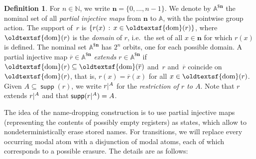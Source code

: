 \documentclass[10pt,a4paper]{amsart}
\theoremstyle{definition}
\newtheorem{defn}[theo]{Definition}
\renewcommand{\textsf}[1]{{\oldtextsf{\small#1}}}
\newcommand\restr[2]{{%
  \left.\kern-\nulldelimiterspace %
  #1 %
  \littletaller %
  \right|{}^{#2} %
}}
\newcommand{\littletaller}{\mathchoice{\vphantom{\big|}}{}{}{}}
\newcommand{\seq}{\subseteq}
\newcommand{\At}{\mathds{A}}
\DeclareMathOperator{\dom}{\textsf{dom}}
\DeclareMathOperator{\supp}{\mathsf{supp}}
\newcommand{\names}{\At}
\newcommand{\parnom}[1]{\names^{\$\mathbf{#1}}}
\newcommand{\setw}[2]{\{#1\,:\,#2\}}
\newcommand{\Nat}{\mathds{N}}
\let\originalleft\left
\let\originalright\right
\renewcommand{\left}{\mathopen{}\mathclose\bgroup\originalleft}
\renewcommand{\right}{\aftergroup\egroup\originalright}
\begin{document}
\begin{defn}\label{defn:dollar}
  For $n\in\Nat$, we write $\mathbf{n}=\{0,\dots,n-1\}$. We denote by
  $\parnom{n}$ the nominal set of all \emph{partial injective maps}
  from $\mathbf{n}$ to $\names$, with the pointwise group action.  The
  support of~$r$ is $\setw{r(x)}{x \in \dom(r)}$, where $\dom(r)$ is
  the \emph{domain} of $r$, i.e.~the set of all $x \in \mathbf{n}$ for
  which $r(x)$ is defined. The nominal set
  $\parnom{n}$ has $2^{n}$ orbits, one for each possible
  domain. A partial injective map
  $\overline{r} \in \parnom{n}$ \emph{extends} $r \in \parnom{n}$ if
  $\dom(r) \seq \dom(\overline{r})$ and~$r$ and~$\overline{r}$
  coincide on $\dom(r)$, that is, $r(x) = \overline{r}(x)$ for all
  $x \in \dom(r)$.  Given $A \seq \supp(r)$, we write $\restr{r}{A}$
  for the \emph{restriction of $r$ to $A$}. Note that $r$ extends
  $\restr{r}{A}$ and that $\supp(\restr{r}{A}) = A$. 
\end{defn}

The idea of the name-dropping construction is to use partial injective maps (representing the contents of possibly empty registers) as states, which allow to nondeterministically erase stored names.
For transitions, we will replace every occurring modal atom with a disjunction of modal atoms, each of which corresponds to a possible erasure. The details are as follows:
\end{document}
